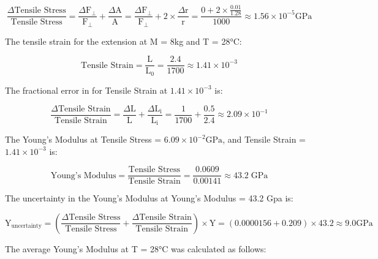 \documentclass{article}
\begin{document}
\begin{equation*}
    \frac{\Delta \text{Tensile~Stress}}{\text{Tensile~Stress}} = \frac{\Delta \text{F}_\bot}{\text{F}_\bot} + \frac{\Delta \text{A}}{\text{A}} = \frac{\Delta \text{F}_\bot}{\text{F}_\bot} + 2 \times \frac{\Delta \text{r}}{\text{r}} = \frac{0 + 2 \times \frac{0.01}{1.28}}{1000} \approx 1.56 \times 10^{-5}\text{GPa} 
\end{equation*}

\par{The tensile strain for the extension at M = 8kg and T = 28°C:}

\begin{equation*}
    \text{Tensile~Strain} = \frac{\text{L}}{\text{L}_\text{0}} = \frac{2.4}{1700} \approx 1.41 \times 10^{-3} 
\end{equation*}

\par{The fractional error in for Tensile Strain at $1.41 \times 10^{-3}$ is:}

\begin{equation*}
    \frac{\Delta \text{Tensile~Strain}}{\text{Tensile~Strain}} = \frac{\Delta \text{L}}{\text{L}} + \frac{\Delta \text{L}_\text{i}}{\text{L}_\text{i}} = \frac{1}{1700} + \frac{0.5}{2.4} \approx 2.09 \times 10^{-1}
\end{equation*}

\par{The Young's Modulus at  Tensile Stress = $6.09 \times 10^{-2} \text{GPa}$, and Tensile Strain = $1.41 \times 10^{-3}$ is:}

\begin{equation*}
    \text{Young's~Modulus} = \frac{\text{Tensile~Stress}}{\text{Tensile~Strain}} = \frac{0.0609}{0.00141} \approx 43.2 \; \text{GPa}
\end{equation*}

\par{The uncertainty in the Young's Modulus at Young's Modulus = 43.2 Gpa is:}

\begin{equation*}
    \text{Y}_{\text{uncertainty}} = (\frac{\Delta \text{Tensile~Stress}}{\text{Tensile~Stress}} + \frac{\Delta \text{Tensile~Strain}}{\text{Tensile~Strain}}) \times \text{Y} =  (0.0000156 + 0.209) \times 43.2 \approx 9.0\text{GPa} 
\end{equation*}

\par{The average Young's Modulus at T = 28°C was calculated as follows:}
\end{document}
